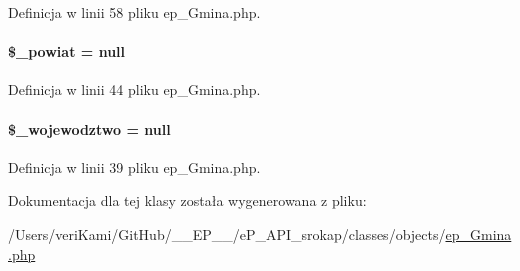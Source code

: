 Definicja w linii 58 pliku ep\-\_\-\-Gmina.\-php.

\hypertarget{classep___gmina_a928275f8378baade592a64f89da229ef}{
\paragraph[{\$\-\_\-powiat}]{\setlength{\rightskip}{0pt plus 5cm}\$\-\_\-powiat = null\hspace{0.3cm}{\ttfamily [protected]}}}\label{classep___gmina_a928275f8378baade592a64f89da229ef}


Definicja w linii 44 pliku ep\-\_\-\-Gmina.\-php.

\hypertarget{classep___gmina_a2a0a830e555a9e31b5118be82dbc33c7}{
\paragraph[{\$\-\_\-wojewodztwo}]{\setlength{\rightskip}{0pt plus 5cm}\$\-\_\-wojewodztwo = null\hspace{0.3cm}{\ttfamily [protected]}}}\label{classep___gmina_a2a0a830e555a9e31b5118be82dbc33c7}


Definicja w linii 39 pliku ep\-\_\-\-Gmina.\-php.



Dokumentacja dla tej klasy została wygenerowana z pliku\-:\begin{DoxyCompactItemize}
\item 
/\-Users/veri\-Kami/\-Git\-Hub/\-\_\-\-\_\-\-E\-P\-\_\-\-\_\-/e\-P\-\_\-\-A\-P\-I\-\_\-srokap/classes/objects/\hyperlink{ep___gmina_8php}{ep\-\_\-\-Gmina.\-php}\end{DoxyCompactItemize}
